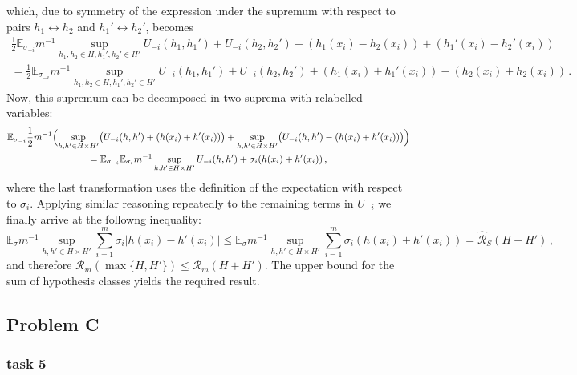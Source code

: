 \documentclass[a4paper]{article}
\newcommand{\ex}{\mathbb{E}}
\begin{document}
which, due to symmetry of the expression under the supremum with respect to pairs
$h_1 \leftrightarrow h_2$ and $h_1' \leftrightarrow h_2'$, becomes
\begin{multline*}
  \frac{1}{2} \ex_{\sigma_{-i}} m^{-1}
      \sup_{h_1, h_2\in H, h_1', h_2'\in H'}
        U_{-i}(h_1,h_1') + U_{-i}(h_2,h_2')
        + (h_1(x_i) - h_2(x_i)) + (h_1'(x_i) - h_2'(x_i)) \\
  = \frac{1}{2} \ex_{\sigma_{-i}} m^{-1}
      \sup_{h_1, h_2\in H, h_1', h_2'\in H'}
        U_{-i}(h_1,h_1') + U_{-i}(h_2,h_2')
        + (h_1(x_i) + h_1'(x_i)) - (h_2(x_i) + h_2(x_i)) \,.
\end{multline*}
Now, this supremum can be decomposed in two suprema with relabelled variables:
\begin{multline*}
  \ex_{\sigma_{-i}} \frac{1}{2} m^{-1} \Bigl(
      \sup_{h, h'\in H\times H'} \bigl(U_{-i}(h,h') + (h(x_i) + h'(x_i))\bigr)
      + \sup_{h, h'\in H\times H'} \bigl(U_{-i}(h,h') - (h(x_i) + h'(x_i))\bigr)
    \Bigr) \\
    = \ex_{\sigma_{-i}} \ex_{\sigma_i} m^{-1}
      \sup_{h, h'\in H\times H'} U_{-i}(h,h') + \sigma_i (h(x_i) + h'(x_i)) \,,
\end{multline*}
where the last transformation uses the definition of the expectation with respect
to $\sigma_i$. Applying similar reasoning repeatedly to the remaining terms in $U_{-i}$
we finally arrive at the followng inequality:
\begin{equation*}
  \ex_\sigma m^{-1} \sup_{h, h'\in H\times H'} \sum_{i=1}^m \sigma_i |h(x_i) - h'(x_i)|
    \leq \ex_\sigma m^{-1} \sup_{h, h'\in H\times H'} \sum_{i=1}^m \sigma_i (h(x_i) + h'(x_i))
    = \hat{\mathcal{R}}_S(H+H')
    \,,
\end{equation*}
and therefore $\mathcal{R}_m(\max\{H,H'\}) \leq \mathcal{R}_m(H+H')$. The upper bound
for the sum of hypothesis classes yields the required result.




\subsection{Problem C} %
\label{sub:problem_c}

\subsubsection{task 5} %
\label{ssub:task_5}




\end{document}
